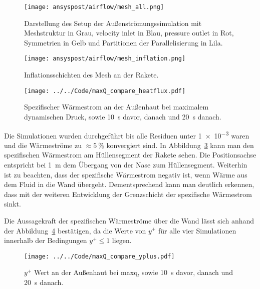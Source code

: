\begin{figure}[H]
  \centering
  \texttt{[image: ansyspost/airflow/mesh\_all.png]}
  \caption{Darstellung des Setup der Außenströmungssimulation mit Meshstruktur in Grau, velocity inlet in Blau, pressure outlet in Rot, Symmetrien in Gelb und Partitionen der Parallelisierung in Lila.}\label{fig:aussenstroemung_mesh}
\end{figure}

\begin{figure}[H]
  \centering
  \texttt{[image: ansyspost/airflow/mesh\_inflation.png]}
  \caption{Inflationsschichten des Mesh an der Rakete.}\label{fig:aussenstroemung_mesh_inflationlayers}
\end{figure}

\begin{figure}[H]
  \centering
  \texttt{[image: ../../Code/maxQ\_compare\_heatflux.pdf]}
  \caption{Spezifischer Wärmestrom an der Außenhaut bei maximalem dynamischen Druck, sowie \SI{10}{s} davor, danach und \SI{20}{s} danach.}\label{fig:spezifischer_waermestrom_maxQ_simulationen}
\end{figure}

Die Simulationen wurden durchgeführt bis alle Residuen unter \SI{1e-3}{} waren und die Wärmeströme zu $\approx\SI{5}{\percent}$ konvergiert sind.
In Abbildung~\ref{fig:spezifischer_waermestrom_maxQ_simulationen} kann man den spezifischen Wärmestrom am Hüllensegment der Rakete sehen.
Die Positionsachse entspricht bei \SI{1}{\meter} dem Übergang von der Nase zum Hüllensegment. Weiterhin ist zu beachten, dass der spezifische Wärmestrom
negativ ist, wenn Wärme aus dem Fluid in die Wand übergeht. Dementsprechend kann man deutlich erkennen, dass mit der weiteren Entwicklung der Grenzschicht
der spezifische Wärmestrom sinkt.

Die Aussagekraft der spezifischen Wärmeströme über die Wand lässt sich anhand der Abbildung~\ref{fig:yplus_maxQ_simulationen} bestätigen, da die Werte von $y^+$
für alle vier Simulationen innerhalb der Bedingungen $y^+ \leq 1$ liegen.

\begin{figure}
  \centering
  \texttt{[image: ../../Code/maxQ\_compare\_yplus.pdf]}
  \caption{$y^+$ Wert an der Außenhaut bei \acs{maxq}, sowie \SI{10}{s} davor, danach und \SI{20}{s} danach.}\label{fig:yplus_maxQ_simulationen}
\end{figure}

\newpage

